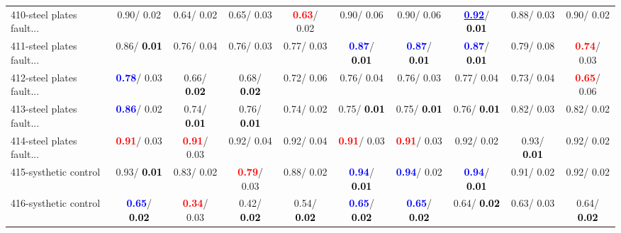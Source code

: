 \begin{table}[h]
\begin{center}
{\begin{tabular}{lc|c|c|c|c|c|c|c|c}
410-steel plates fault... &   0.90/  0.02 &   0.64/  0.02 &   0.65/  0.03 & \textcolor{red}{\textbf{  0.63}}/  0.02 &   0.90/  0.06 &   0.90/  0.06 & \underline{\textcolor{blue}{\textbf{  0.92}}}/\textcolor{black}{\textbf{  0.01}} &   0.88/  0.03 &   0.90/  0.02 \\
411-steel plates fault... &   0.86/\textcolor{black}{\textbf{  0.01}} &   0.76/  0.04 &   0.76/  0.03 &   0.77/  0.03 & \textcolor{blue}{\textbf{  0.87}}/\textcolor{black}{\textbf{  0.01}} & \textcolor{blue}{\textbf{  0.87}}/\textcolor{black}{\textbf{  0.01}} & \textcolor{blue}{\textbf{  0.87}}/\textcolor{black}{\textbf{  0.01}} &   0.79/  0.08 & \textcolor{red}{\textbf{  0.74}}/  0.03 \\
412-steel plates fault... & \textcolor{blue}{\textbf{  0.78}}/  0.03 &   0.66/\textcolor{black}{\textbf{  0.02}} &   0.68/\textcolor{black}{\textbf{  0.02}} &   0.72/  0.06 &   0.76/  0.04 &   0.76/  0.03 &   0.77/  0.04 &   0.73/  0.04 & \textcolor{red}{\textbf{  0.65}}/  0.06 \\ \hline
413-steel plates fault... & \textcolor{blue}{\textbf{  0.86}}/  0.02 &   0.74/\textcolor{black}{\textbf{  0.01}} &   0.76/\textcolor{black}{\textbf{  0.01}} &   0.74/  0.02 &   0.75/\textcolor{black}{\textbf{  0.01}} &   0.75/\textcolor{black}{\textbf{  0.01}} &   0.76/\textcolor{black}{\textbf{  0.01}} &   0.82/  0.03 &   0.82/  0.02 \\
414-steel plates fault... & \textcolor{red}{\textbf{  0.91}}/  0.03 & \textcolor{red}{\textbf{  0.91}}/  0.03 &   0.92/  0.04 &   0.92/  0.04 & \textcolor{red}{\textbf{  0.91}}/  0.03 & \textcolor{red}{\textbf{  0.91}}/  0.03 &   0.92/  0.02 &   0.93/\textcolor{black}{\textbf{  0.01}} &   0.92/  0.02 \\
415-systhetic control &   0.93/\textcolor{black}{\textbf{  0.01}} &   0.83/  0.02 & \textcolor{red}{\textbf{  0.79}}/  0.03 &   0.88/  0.02 & \textcolor{blue}{\textbf{  0.94}}/\textcolor{black}{\textbf{  0.01}} & \textcolor{blue}{\textbf{  0.94}}/  0.02 & \textcolor{blue}{\textbf{  0.94}}/\textcolor{black}{\textbf{  0.01}} &   0.91/  0.02 &   0.92/  0.02 \\
416-systhetic control & \textcolor{blue}{\textbf{  0.65}}/\textcolor{black}{\textbf{  0.02}} & \textcolor{red}{\textbf{  0.34}}/  0.03 &   0.42/\textcolor{black}{\textbf{  0.02}} &   0.54/\textcolor{black}{\textbf{  0.02}} & \textcolor{blue}{\textbf{  0.65}}/\textcolor{black}{\textbf{  0.02}} & \textcolor{blue}{\textbf{  0.65}}/\textcolor{black}{\textbf{  0.02}} &   0.64/\textcolor{black}{\textbf{  0.02}} &   0.63/  0.03 &   0.64/\textcolor{black}{\textbf{  0.02}} \\\end{tabular}}\label{stratsALCKappa12Allallb}
\end{center}
\end{table}
